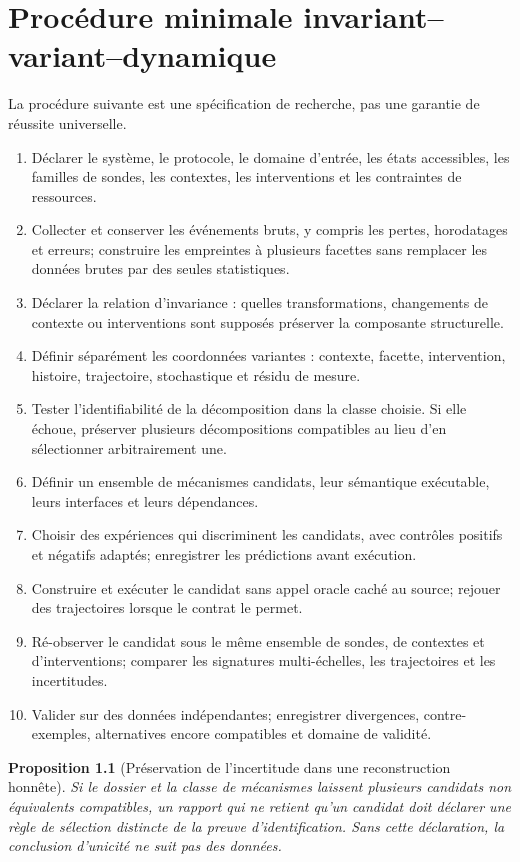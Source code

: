 \documentclass[11pt,oneside]{book}
\newtheorem{proposition}[theoreme]{Proposition}
\theoremstyle{definition}\newtheorem{definition}[theoreme]{Définition}\newtheorem{hypothese}[theoreme]{Hypothèse explicite}\newtheorem{convention}[theoreme]{Convention}\newtheorem{critere}[theoreme]{Critère}
\theoremstyle{remark}\newtheorem{remarque}[theoreme]{Remarque}\newtheorem{contreexemple}[theoreme]{Contre-exemple}
\begin{document}
\chapter{Procédure minimale invariant--variant--dynamique}
La procédure suivante est une spécification de recherche, pas une garantie de réussite universelle.
\begin{enumerate}[label=\textbf{P\arabic*.}]
\item Déclarer le système, le protocole, le domaine d'entrée, les états accessibles, les familles de sondes, les contextes, les interventions et les contraintes de ressources.
\item Collecter et conserver les événements bruts, y compris les pertes, horodatages et erreurs; construire les empreintes à plusieurs facettes sans remplacer les données brutes par des seules statistiques.
\item Déclarer la relation d'invariance : quelles transformations, changements de contexte ou interventions sont supposés préserver la composante structurelle.
\item Définir séparément les coordonnées variantes : contexte, facette, intervention, histoire, trajectoire, stochastique et résidu de mesure.
\item Tester l'identifiabilité de la décomposition dans la classe choisie. Si elle échoue, préserver plusieurs décompositions compatibles au lieu d'en sélectionner arbitrairement une.
\item Définir un ensemble de mécanismes candidats, leur sémantique exécutable, leurs interfaces et leurs dépendances.
\item Choisir des expériences qui discriminent les candidats, avec contrôles positifs et négatifs adaptés; enregistrer les prédictions avant exécution.
\item Construire et exécuter le candidat sans appel oracle caché au source; rejouer des trajectoires lorsque le contrat le permet.
\item Ré-observer le candidat sous le même ensemble de sondes, de contextes et d'interventions; comparer les signatures multi-échelles, les trajectoires et les incertitudes.
\item Valider sur des données indépendantes; enregistrer divergences, contre-exemples, alternatives encore compatibles et domaine de validité.
\end{enumerate}
\begin{proposition}[Préservation de l'incertitude dans une reconstruction honnête]
Si le dossier et la classe de mécanismes laissent plusieurs candidats non équivalents compatibles, un rapport qui ne retient qu'un candidat doit déclarer une règle de sélection distincte de la preuve d'identification. Sans cette déclaration, la conclusion d'unicité ne suit pas des données.
\end{proposition}
\end{document}
